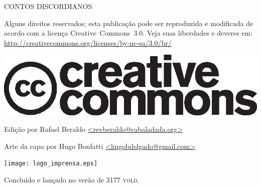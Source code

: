 \thispagestyle{empty}
\begin{center}
{\tiny
CONTOS DISCORDIANOS

\vspace{.5cm}

\begin{minipage}[h]{.6\textwidth}
Alguns direitos reservados; esta publicação pode ser reproduzida e modificada de acordo com a licença \foreignlanguage{english}{Creative~Commons~3.0}. Veja suas liberdades e deveres em: \url{http://creativecommons.org/licenses/by-nc-sa/3.0/br/}
	\begin{center}
	\includegraphics[scale=.2]{cc.eps}
	\end{center}
\end{minipage}

\vspace{.5cm}

\begin{minipage}[h]{.6\textwidth}
\centering
Edição por Rafael Beraldo \url{<revberaldo@cabaladada.org>}

	\vspace{.2em}

Arte da capa por Hugo Bonfatti \url{<hugobdelgado@gmail.com>}
\end{minipage}

\vfill

\begin{minipage}[h]{.6\textwidth}
\centering
	\texttt{[image: logo\_imprensa.eps]}

Concluído e lançado no verão de 3177 \textsc{yold}.
\end{minipage}
}
\end{center}
\newpage
